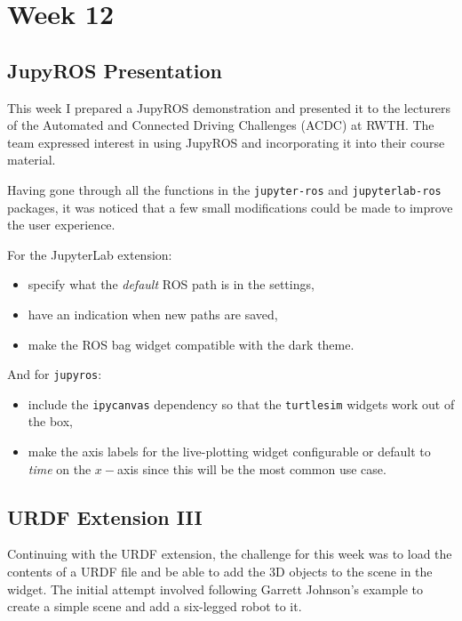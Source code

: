 \chapter{Week 12}

    \section{JupyROS Presentation}

    This week I prepared a JupyROS demonstration and presented it to the lecturers of the Automated and Connected Driving Challenges (ACDC) at RWTH. The team expressed interest in using JupyROS and incorporating it into their course material.

    Having gone through all the functions in the \texttt{jupyter-ros} and \texttt{jupyterlab-ros} packages, it was noticed that a few small modifications could be made to improve the user experience.

    For the JupyterLab extension:
    \begin{itemize}
        \item specify what the \textit{default} ROS path is in the settings,
        \item have an indication when new paths are saved,
        \item make the ROS bag widget compatible with the dark theme.
    \end{itemize}

    And for \texttt{jupyros}:
    \begin{itemize}
        \item include the \texttt{ipycanvas} dependency so that the \texttt{turtlesim} widgets work out of the box,
        \item make the axis labels for the live-plotting widget configurable or default to \textit{time} on the $x-$axis since this will be the most common use case.
    \end{itemize}

    \section{URDF Extension III}

    Continuing with the URDF extension, the challenge for this week was to load the contents of a URDF file and be able to add the 3D objects to the scene in the widget. The initial attempt involved following Garrett Johnson's example to create a simple scene and add a six-legged robot to it. 

